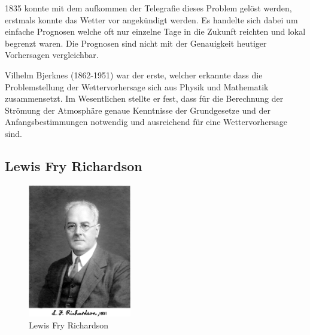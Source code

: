 \begin{refsection}
1835 konnte mit dem aufkommen der Telegrafie dieses Problem gelöst werden, erstmals konnte das Wetter vor angekündigt werden. Es handelte sich dabei um einfache Prognosen welche oft nur einzelne Tage in die Zukunft reichten und lokal begrenzt waren. Die Prognosen sind nicht mit der Genauigkeit heutiger Vorhersagen vergleichbar.

Vilhelm Bjerknes (1862-1951) war der erste, welcher erkannte dass die Problemstellung der Wettervorhersage sich aus Physik und Mathematik zusammensetzt. Im Wesentlichen stellte er fest, dass für die Berechnung der Strömung der Atmosphäre genaue Kenntnisse der Grundgesetze und der Anfangsbestimmungen notwendig und ausreichend für eine Wettervorhersage sind.

\subsection{Lewis Fry Richardson
\label{klima:subsection:richardson}}

\begin{figure}
\centering
\includegraphics[width=0.4\textwidth]{klima/richardson.jpg}
\caption{Lewis Fry Richardson \cite{klima:biography}
\label{klima:geschichte:richardson}}
\end{figure}


\end{refsection}

